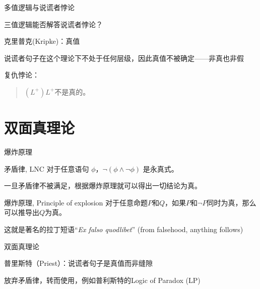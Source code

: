 \documentclass{zhslides}
\begin{document}
\begin{frame}[t]{多值逻辑与说谎者悖论}

  \vspace{4ex}
  \begin{brainstorm*}{}
    三值逻辑能否解答说谎者悖论？
  \end{brainstorm*}
  \vspace{2ex}
  \pause
  
  \bit
    \item 克里普克(Kripke)：真值
    \item 说谎者句子在这个理论下不处于任何层级，因此真值不被确定——非真也非假
  \eit
  \vspace{2ex}
  \pause
  
  复仇悖论：
  \begin{quote}
    $(L^+)$\quad $L^+$不是真的。
  \end{quote}

\end{frame}



\section{双面真理论}

\begin{frame}{爆炸原理}
  
  \begin{law*}{矛盾律, LNC}
    对于任意语句 $\phi$，$\neg(\phi \land \neg \phi)$ 是永真式。
  \end{law*}
  \vspace{1ex}
  \pause
  
  一旦矛盾律不被满足，根据爆炸原理就可以得出一切结论为真。
  
  \begin{law*}{爆炸原理, Principle of explosion}
    对于任意命题$P$和$Q$，如果$P$和$\neg P$同时为真，那么可以推导出$Q$为真。
  \end{law*}
  这就是著名的拉丁短语``\textit{Ex falso quodlibet}'' (from falsehood, anything follows)
  
\end{frame}


\begin{frame}{双面真理论}
  
  \bit
    \item 普里斯特（Priest）：说谎者句子是真值而非缝隙
    \item 放弃矛盾律，转而使用，例如普利斯特的Logic of Paradox (LP)
  \eit
  
\end{frame}
\end{document}
